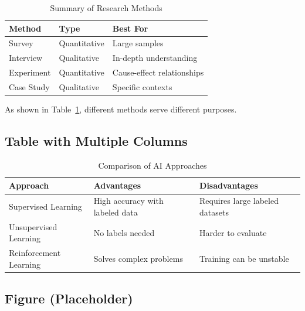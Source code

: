 \begin{table}[htbp]
    \centering
    \caption{Summary of Research Methods}
    \label{tab:research-methods}
    \begin{tabular}{lll}
        \toprule
        \textbf{Method} & \textbf{Type} & \textbf{Best For} \\
        \midrule
        Survey & Quantitative & Large samples \\
        Interview & Qualitative & In-depth understanding \\
        Experiment & Quantitative & Cause-effect relationships \\
        Case Study & Qualitative & Specific contexts \\
        \bottomrule
    \end{tabular}
\end{table}

As shown in Table~\ref{tab:research-methods}, different methods serve different purposes.

\subsection*{Table with Multiple Columns}

\begin{table}[htbp]
    \centering
    \caption{Comparison of AI Approaches}
    \label{tab:ai-comparison}
    \begin{tabular}{p{3cm}p{4cm}p{4cm}}
        \toprule
        \textbf{Approach} & \textbf{Advantages} & \textbf{Disadvantages} \\
        \midrule
        Supervised Learning & High accuracy with labeled data & Requires large labeled datasets \\
        Unsupervised Learning & No labels needed & Harder to evaluate \\
        Reinforcement Learning & Solves complex problems & Training can be unstable \\
        \bottomrule
    \end{tabular}
\end{table}

\subsection*{Figure (Placeholder)}

%

